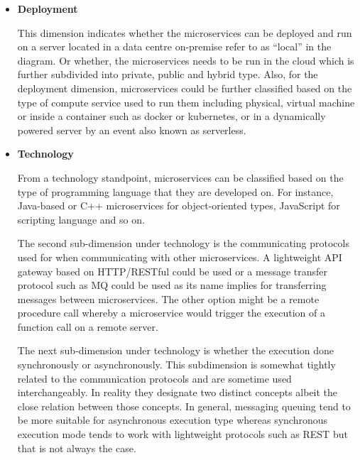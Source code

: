 \documentclass{article}
\begin{document}
\begin{itemize}

\item \textbf{Deployment}


This dimension indicates whether the microservices can be deployed and run on a server located in a data centre on-premise refer to as “local” in the diagram. Or whether, the microservices needs to be run in the cloud which is further subdivided into private, public and hybrid type. Also, for the deployment dimension, microservices could be further classified based on the type of compute service used to run them including physical, virtual machine or inside a container such as docker or kubernetes, or in a dynamically powered server by an event also known as serverless.

\item \textbf{Technology}

From a technology standpoint, microservices can be classified based on the type of programming language that they are developed on. For instance, Java-based or C++ microservices for object-oriented types, JavaScript for scripting language and so on. 

The second sub-dimension under technology is the communicating protocols used for when communicating with other microservices. A lightweight API gateway based on HTTP/RESTful could be used or a message transfer protocol such as MQ could be used as its name implies for transferring messages between microservices. The other option might be a remote procedure call whereby a microservice would trigger the execution of a function call on a remote server.

The next sub-dimension under technology is whether the execution done synchronously or asynchronously. This subdimension is somewhat tightly related to the communication protocols and are sometime used interchangeably. In reality they designate two distinct concepts albeit the close relation between those concepts. In general, messaging queuing tend to be more suitable for asynchronous execution type whereas synchronous execution mode tends to work with lightweight protocols such as REST but that is not always the case.


\end{itemize}
\end{document}
